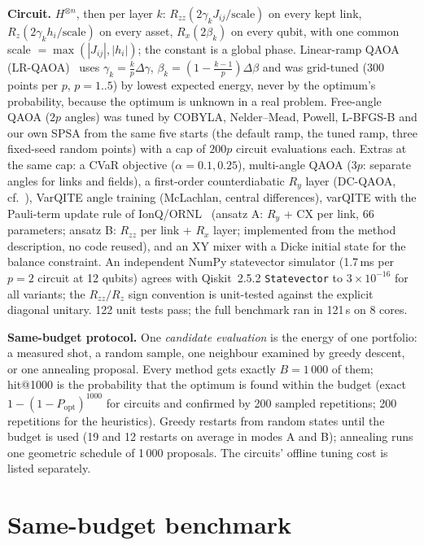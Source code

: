 \documentclass[10pt,twocolumn]{article}
\begin{document}
\textbf{Circuit.} $H^{\otimes n}$, then per layer $k$: $R_{zz}(2\gamma_k J_{ij}/\text{scale})$ on every kept link, $R_z(2\gamma_k h_i/\text{scale})$ on every asset, $R_x(2\beta_k)$ on every qubit, with one common scale $=\max(|J_{ij}|,|h_i|)$; the constant is a global phase. Linear-ramp QAOA (LR-QAOA)~\cite{lrqaoa} uses $\gamma_k=\tfrac{k}{p}\Delta\gamma$, $\beta_k=(1-\tfrac{k-1}{p})\Delta\beta$ and was grid-tuned (300 points per $p$, $p=1..5$) by lowest expected energy, never by the optimum's probability, because the optimum is unknown in a real problem. Free-angle QAOA ($2p$ angles) was tuned by COBYLA, Nelder--Mead, Powell, L-BFGS-B and our own SPSA from the same five starts (the default ramp, the tuned ramp, three fixed-seed random points) with a cap of $200p$ circuit evaluations each. Extras at the same cap: a CVaR objective ($\alpha=0.1,0.25$), multi-angle QAOA ($3p$: separate angles for links and fields), a first-order counterdiabatic $R_y$ layer (DC-QAOA, cf.~\cite{kipu}), VarQITE angle training (McLachlan, central differences), varQITE with the Pauli-term update rule of IonQ/ORNL~\cite{varqite} (ansatz A: $R_y$ + CX per link, 66 parameters; ansatz B: $R_{zz}$ per link + $R_x$ layer; implemented from the method description, no code reused), and an XY mixer with a Dicke initial state for the balance constraint. An independent NumPy statevector simulator (1.7\,ms per $p=2$ circuit at 12 qubits) agrees with Qiskit~2.5.2 \texttt{Statevector} to $3\times10^{-16}$ for all variants; the $R_{zz}/R_z$ sign convention is unit-tested against the explicit diagonal unitary. 122 unit tests pass; the full benchmark ran in 121\,s on 8 cores.

\textbf{Same-budget protocol.} One \emph{candidate evaluation} is the energy of one portfolio: a measured shot, a random sample, one neighbour examined by greedy descent, or one annealing proposal. Every method gets exactly $B=1\,000$ of them; hit@1000 is the probability that the optimum is found within the budget (exact $1-(1-P_{\mathrm{opt}})^{1000}$ for circuits and confirmed by 200 sampled repetitions; 200 repetitions for the heuristics). Greedy restarts from random states until the budget is used (19 and 12 restarts on average in modes A and B); annealing runs one geometric schedule of 1\,000 proposals. The circuits' offline tuning cost is listed separately.

\section{Same-budget benchmark}
\begin{table}[t]\centering\footnotesize\setlength{\tabcolsep}{4.5pt}
\caption{Same-budget benchmark at 12 assets, $\eta=1$, balance off. hit@1000: probability of finding the optimal portfolio within 1\,000 candidate evaluations. $P_{\mathrm{opt}}$: probability that a single shot is the optimum (uniform: $1/4096=0.00024$). Quality $=(E_{\max}-\langle E\rangle)/(E_{\max}-E_{\min})$ of the sampled distribution (1 = always the optimum). Tuning: offline simulated circuits used to choose the angles (all optimisers and starts at that $p$). Best $p$ is given as A\,/\,B.}

\end{table}
\end{document}

